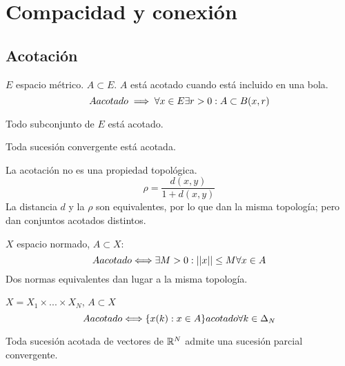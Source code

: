 \chapter{Compacidad y conexión}
\section{Acotación}

\begin{definicion}
    $E$ espacio métrico. $A \subset E$.
    $A$ está acotado cuando está incluido en una bola.
    $$A\\ acotado \implies \forall x \in E \\ \exists r > 0 : A \subset B(x,r)$$
\end{definicion}

\begin{ejemplo}
    Todo subconjunto de $E$ está acotado.
\end{ejemplo}

\begin{ejemplo}
    Toda sucesión convergente está acotada.
\end{ejemplo}

\noindent
La acotación no es una propiedad topológica. 
$$\rho = \frac{d(x,y)}{1+d(x,y)}$$
La distancia $d$ y la $\rho$ son equivalentes, por lo que dan la misma topología; pero dan conjuntos acotados distintos.

\begin{prop}
    $X$ espacio normado, $A \subset X$:
    $$A \\ acotado \Longleftrightarrow \exists M > 0 : ||x|| \leq M \\ \forall x \in A$$
    Dos normas equivalentes dan lugar a la misma topología.
\end{prop}

\begin{prop}
    $X = X_1 \times ... \times X_N$, $A \subset X$
    $$A \\ acotado \\\Longleftrightarrow \\\{x(k): x \in A\} \\ acotado \\ \forall k \in \Delta_N$$
\end{prop}

\begin{teo}
    Toda sucesión acotada de vectores de $\mathbb R^N$ admite una sucesión parcial convergente.
\end{teo}

